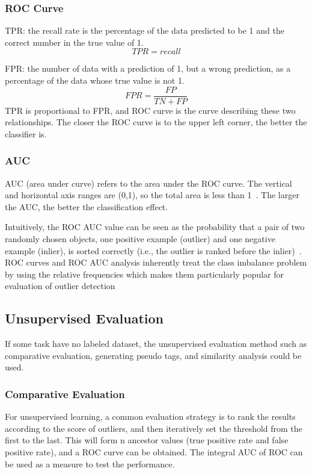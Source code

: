 \subsubsection{ROC Curve}
TPR:
the recall rate is the percentage of the data
 predicted to be 1 and the correct number in the
 true value of 1.
 \begin{equation}
TPR=recall
 \end{equation}

FPR:
the number of data with a prediction of 1,
but a wrong prediction,
as a percentage of the data whose true value is not 1.
\begin{equation}
  FPR=\frac{FP}{TN+FP}
\end{equation}
TPR is proportional to FPR,
and ROC curve is the curve describing these two relationships.
The closer the ROC curve is to the upper left corner,
the better the classifier is.

\subsubsection{AUC}
AUC (area under curve) refers to the area under the ROC curve.
The vertical and horizontal axis ranges are (0,1),
so the total area is less than 1~\cite{bradley1997use}.
The larger the AUC,
the better the classification effect.

Intuitively, 
the ROC AUC value can be seen as the probability that a pair
of two randomly chosen objects,
one positive example (outlier) 
and one negative example (inlier),
is sorted correctly
(i.e.,
the outlier is ranked before the inlier)~\cite{hanley1982meaning}.
ROC curves
and ROC AUC analysis inherently treat the class imbalance
problem by using the relative frequencies which makes them
particularly popular for evaluation of outlier detection

\subsection{Unsupervised Evaluation}
If some task have no labeled dataset,
the unsupervised evaluation method 
such as comparative evaluation,
generating pseudo tags,
and similarity analysis could be used.

\subsubsection{Comparative Evaluation}

For unsupervised learning, 
a common evaluation strategy is to rank the 
results according to the score of outliers, 
and then iteratively set the threshold from 
the first to the last. 
This will form n ancestor values 
(true positive rate and false positive rate), 
and a ROC curve can be obtained. 
The integral AUC of ROC can be used as a measure 
to test the performance.


